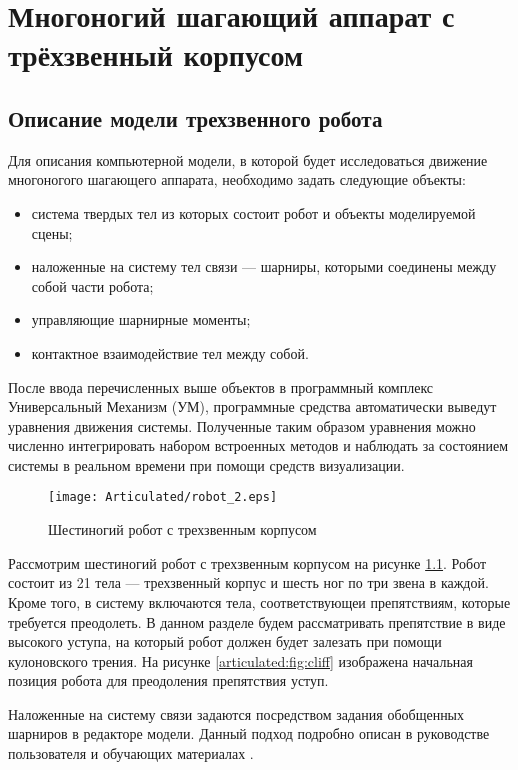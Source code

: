 \chapter{Многоногий шагающий аппарат с трёхзвенный корпусом}
\label{articulated}

\section{Описание модели трехзвенного робота}

Для описания компьютерной модели, в которой будет исследоваться движение многоногого шагающего аппарата, необходимо задать следующие объекты:

\begin{itemize}
\item система твердых тел из которых состоит робот и объекты моделируемой сцены;
\item наложенные на систему тел связи --- шарниры, которыми соединены между собой части робота;
\item управляющие шарнирные моменты;
\item контактное взаимодействие тел между собой.
\end{itemize}

После ввода перечисленных выше объектов в программный комплекс Универсальный Механизм (УМ), программные средства автоматически выведут уравнения движения системы. Полученные таким образом уравнения можно численно интегрировать набором встроенных методов и наблюдать за состоянием системы в реальном времени при помощи средств визуализации.

\begin{figure}[ht]
  \centering
  \texttt{[image: Articulated/robot\_2.eps]}
  \caption{Шестиногий робот с трехзвенным корпусом}
  \label{articulated:fig:robot}
\end{figure}

Рассмотрим шестиногий робот с трехзвенным корпусом на рисунке \ref{articulated:fig:robot}. Робот состоит из 21 тела --- трехзвенный корпус и шесть ног по три звена в каждой. Кроме того, в систему включаются тела, соответствующеи препятствиям, которые требуется преодолеть. В данном разделе будем рассматривать препятствие в виде высокого уступа, на который робот должен будет залезать при помощи кулоновского трения. На рисунке \ref{articulated:fig:cliff} изображена начальная позиция робота для преодоления препятствия уступ.

Наложенные на систему связи задаются посредством задания обобщенных шарниров в редакторе модели. Данный подход подробно описан в руководстве пользователя  и обучающих материалах .


